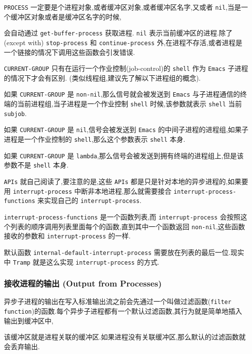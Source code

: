 \documentclass[11pt]{article}
\begin{document}
\texttt{PROCESS} 一定要是个进程对象,或者缓冲区对象,或者缓冲区名字,又或者 \texttt{nil},当是一个缓冲区对象或者是缓冲区名字的时候,

会自动通过 \texttt{get-buffer-process} 获取进程. \texttt{nil} 表示当前缓冲区的进程.除了(except with) \texttt{stop-process} 和 \texttt{continue-process} 外,在进程不存活,或者进程是一个链接的情况下调用这些函数会引发错误.


\texttt{CURRENT-GROUP} 只有在运行一个作业控制(job-control)的 \texttt{shell} 作为 \texttt{Emacs} 子进程的情况下才会有区别. (类似线程组,建议先了解以下进程组的概念).

如果 \texttt{CURRENT-GROUP} 是 \texttt{non-nil},那么信号就会被发送到 \texttt{Emacs} 与子进程通信的终端的当前进程组,当子进程是一个作业控制 \texttt{shell} 时候,该参数就表示 \texttt{shell} 当前 \texttt{subjob}.

如果 \texttt{CURRENT-GROUP} 是 \texttt{nil},信号会被发送到 \texttt{Emacs} 的中间子进程的进程组,如果子进程是一个作业控制的 \texttt{shell},那么这个参数表示 \texttt{shell} 本身.

如果 \texttt{CURRENT-GROUP} 是 \texttt{lambda},那么信号会被发送到拥有终端的进程组上,但是该参数不是 \texttt{shell} 本身.

\texttt{APIs} 就自己阅读了,要注意的是,这些 \texttt{APIs} 都是只是针对本地的异步进程的,如果要用  \texttt{interrupt-process} 中断非本地进程,那么就需要接合 \texttt{interrupt-process-functions} 来实现自己的 \texttt{interrupt-process}.

\texttt{interrupt-process-functions} 是一个函数列表,而 \texttt{interrupt-process} 会按照这个列表的顺序调用列表里面每个的函数,直到其中一个函数返回 \texttt{non-nil},这些函数接收的参数和 \texttt{interrupt-process} 的一样.

默认函数 \texttt{internal-default-interrupt-process} 需要放在列表的最后一位.现实中 \texttt{Tramp} 就是这么实现 \texttt{interrupt-process} 的方式.





\subsubsection{接收进程的输出 (Output from Processes)}
\label{sec:org0d1769e}

异步子进程的输出在写入标准输出流之前会先通过一个叫做过滤函数(\texttt{filter function})的函数.每个异步子进程都有一个默认过滤函数,其行为就是简单地插入输出到缓冲区中,

该缓冲区就是进程关联的缓冲区.如果进程没有关联缓冲区,那么默认的过滤函数就会丢弃输出.
\end{document}
